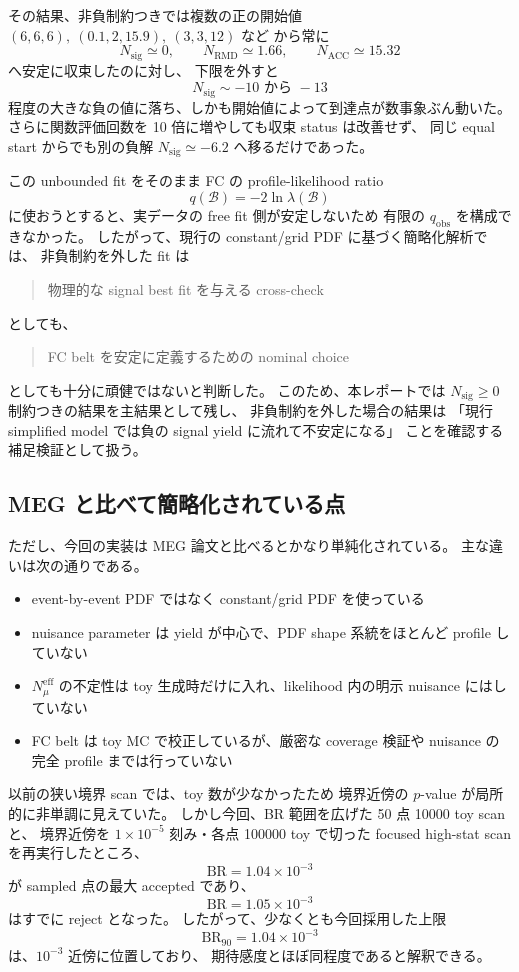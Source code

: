\documentclass[a4paper,11pt]{jsarticle}
\begin{document}
その結果、非負制約つきでは複数の正の開始値
\((6,6,6),\ (0.1,2,15.9),\ (3,3,12)\) など
から常に
\[
N_{\mathrm{sig}}\simeq 0,\qquad
N_{\mathrm{RMD}}\simeq 1.66,\qquad
N_{\mathrm{ACC}}\simeq 15.32
\]
へ安定に収束したのに対し、
下限を外すと
\[
N_{\mathrm{sig}}\sim -10 \text{ から } -13
\]
程度の大きな負の値に落ち、しかも開始値によって到達点が数事象ぶん動いた。
さらに関数評価回数を 10 倍に増やしても収束 status は改善せず、
同じ equal start からでも別の負解
\(N_{\mathrm{sig}}\simeq -6.2\)
へ移るだけであった。

この unbounded fit をそのまま FC の
profile-likelihood ratio
\[
q(\mathcal{B})=-2\ln\lambda(\mathcal{B})
\]
に使おうとすると、実データの free fit 側が安定しないため
有限の \(q_{\mathrm{obs}}\) を構成できなかった。
したがって、現行の constant/grid PDF に基づく簡略化解析では、
非負制約を外した fit は
\begin{quote}
物理的な signal best fit を与える cross-check
\end{quote}
としても、
\begin{quote}
FC belt を安定に定義するための nominal choice
\end{quote}
としても十分に頑健ではないと判断した。
このため、本レポートでは
\(N_{\mathrm{sig}}\ge 0\)
制約つきの結果を主結果として残し、
非負制約を外した場合の結果は
「現行 simplified model では負の signal yield に流れて不安定になる」
ことを確認する補足検証として扱う。

\subsection{MEG と比べて簡略化されている点}
ただし、今回の実装は MEG 論文と比べるとかなり単純化されている。
主な違いは次の通りである。

\begin{itemize}
  \item event-by-event PDF ではなく constant/grid PDF を使っている
  \item nuisance parameter は yield が中心で、PDF shape 系統をほとんど profile していない
  \item \(N_{\mu}^{\mathrm{eff}}\) の不定性は toy 生成時だけに入れ、likelihood 内の明示 nuisance にはしていない
  \item FC belt は toy MC で校正しているが、厳密な coverage 検証や nuisance の完全 profile までは行っていない
\end{itemize}

以前の狭い境界 scan では、toy 数が少なかったため
境界近傍の \(p\)-value が局所的に非単調に見えていた。
しかし今回、BR 範囲を広げた 50 点 10000 toy scan と、
境界近傍を \(1\times10^{-5}\) 刻み・各点 100000 toy で切った
focused high-stat scan を再実行したところ、
\[
\mathrm{BR}=1.04\times10^{-3}
\]
が sampled 点の最大 accepted であり、
\[
\mathrm{BR}=1.05\times10^{-3}
\]
はすでに reject となった。
したがって、少なくとも今回採用した上限
\[
\mathrm{BR}_{90}=1.04\times10^{-3}
\]
は、\(10^{-3}\) 近傍に位置しており、
期待感度とほぼ同程度であると解釈できる。
\end{document}
